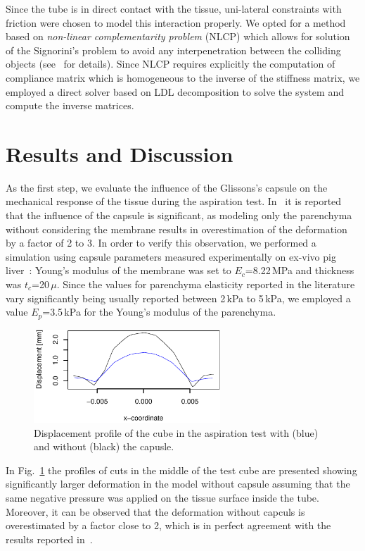 \documentclass{acm_proc_article-sp}
\begin{document}
Since the tube is in direct contact with the tissue, uni-lateral constraints with friction were chosen 
to model this interaction properly. We opted for a method based on \emph{non-linear complementarity problem}  (NLCP)
which allows for solution of the Signorini's problem to avoid any interpenetration between the colliding 
objects (see~\cite{} for details). Since NLCP requires explicitly the computation of compliance matrix which 
is homogeneous to the inverse of the stiffness matrix, we employed a direct solver based on LDL decomposition to 
solve the system and compute the inverse matrices. 


\section{Results and Discussion} %
As the first step, we evaluate the influence of the Glissons's capsule on the mechanical response of the tissue during
the aspiration test. 
In~\cite{Hollenstein2006} it is reported that the influence of the capsule is significant, as modeling 
only the parenchyma without considering the membrane results in overestimation of the deformation by a factor of 2 to 3. 
In order to verify this observation, we performed a simulation using capsule parameters measured experimentally on 
ex-vivo pig liver~\cite{Umale2011}: Young's modulus of the membrane was set to $E_c$=8.22\,MPa and thickness was
$t_c$=20\,$\mu$. 
Since the values for parenchyma elasticity reported in the literature vary significantly being usually reported between 2\,kPa to 5\,kPa, 
we employed a value $E_p$=3.5\,kPa for the Young's modulus of the parenchyma. 

\begin{figure}
  \centering
  \includegraphics[width=7cm]{aspiration.pdf}
  \caption{\label{fig-aspiration2} Displacement profile of the cube in the
  aspiration test with (blue) and without (black) the capusle.}
\end{figure}

In Fig.~\ref{fig-aspiration2} the profiles of cuts in the middle of the
test cube are presented showing significantly larger deformation in the model without capsule assuming that the same negative pressure was applied 
on the tissue surface inside the tube. Moreover, it can be observed that the deformation without capculs is overestimated by a factor 
close to 2, which is in perfect agreement with the results reported in~\cite{Hollenstein2006}.
\end{document}
